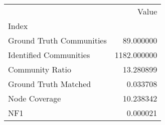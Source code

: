 \begin{tabular}{lr}
\toprule
{} &        Value \\
Index                    &              \\
\midrule
Ground Truth Communities &    89.000000 \\
Identified Communities   &  1182.000000 \\
Community Ratio          &    13.280899 \\
Ground Truth Matched     &     0.033708 \\
Node Coverage            &    10.238342 \\
NF1                      &     0.000021 \\
\bottomrule
\end{tabular}
